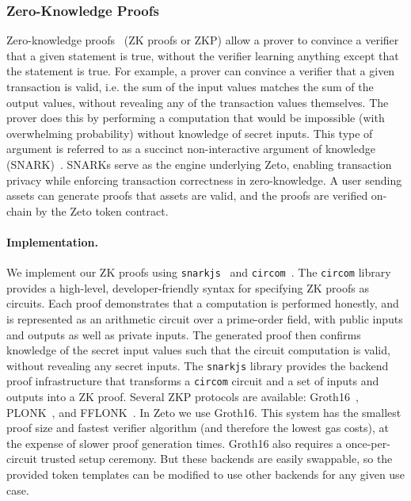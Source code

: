 \subsubsection{Zero-Knowledge Proofs}

Zero-knowledge proofs~\cite{TODO} (ZK proofs or ZKP) allow a prover to convince a verifier that a given statement is true, without the verifier learning anything except that the statement is true. For example, a prover can convince a verifier that a given transaction is valid, i.e. the sum of the input values matches the sum of the output values, without revealing any of the transaction values themselves. The prover does this by performing a computation that would be impossible (with overwhelming probability) without knowledge of secret inputs. This type of argument is referred to as a succinct non-interactive argument of knowledge (SNARK)~\cite{TODO}. SNARKs serve as the engine underlying Zeto, enabling transaction privacy while enforcing transaction correctness in zero-knowledge. A user sending assets can generate proofs that assets are valid, and the proofs are verified on-chain by the Zeto token contract.

\paragraph{Implementation.} We implement our ZK proofs using \texttt{snarkjs}~\cite{TODO} and \texttt{circom}~\cite{TODO}. The \texttt{circom} library provides a high-level, developer-friendly syntax for specifying ZK proofs as circuits. Each proof demonstrates that a computation is performed honestly, and is represented as an arithmetic circuit over a prime-order field, with public inputs and outputs as well as private inputs. The generated proof then confirms knowledge of the secret input values such that the circuit computation is valid, without revealing any secret inputs. The \texttt{snarkjs} library provides the backend proof infrastructure that transforms a \texttt{circom} circuit and a set of inputs and outputs into a ZK proof. Several ZKP protocols are available: Groth16~\cite{TODO}, PLONK~\cite{TODO}, and FFLONK~\cite{TODO}. In Zeto we use Groth16. This system has the smallest proof size and fastest verifier algorithm (and therefore the lowest gas costs), at the expense of slower proof generation times. Groth16 also requires a once-per-circuit trusted setup ceremony. But these backends are easily swappable, so the provided token templates can be modified to use other backends for any given use case.


